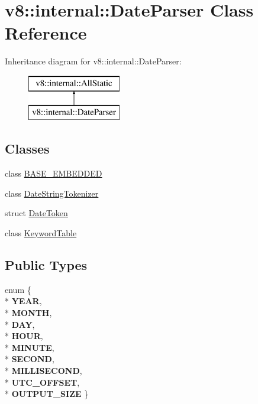 \hypertarget{classv8_1_1internal_1_1_date_parser}{}\section{v8\+:\+:internal\+:\+:Date\+Parser Class Reference}
\label{classv8_1_1internal_1_1_date_parser}
Inheritance diagram for v8\+:\+:internal\+:\+:Date\+Parser\+:\begin{figure}[H]
\begin{center}
\leavevmode
\includegraphics[height=2.000000cm]{classv8_1_1internal_1_1_date_parser}
\end{center}
\end{figure}
\subsection*{Classes}
\begin{DoxyCompactItemize}
\item 
class \hyperlink{classv8_1_1internal_1_1_date_parser_1_1_b_a_s_e___e_m_b_e_d_d_e_d}{B\+A\+S\+E\+\_\+\+E\+M\+B\+E\+D\+D\+ED}
\item 
class \hyperlink{classv8_1_1internal_1_1_date_parser_1_1_date_string_tokenizer}{Date\+String\+Tokenizer}
\item 
struct \hyperlink{structv8_1_1internal_1_1_date_parser_1_1_date_token}{Date\+Token}
\item 
class \hyperlink{classv8_1_1internal_1_1_date_parser_1_1_keyword_table}{Keyword\+Table}
\end{DoxyCompactItemize}
\subsection*{Public Types}
\begin{DoxyCompactItemize}
\item 
enum \{ \\*
{\bfseries Y\+E\+AR}, 
\\*
{\bfseries M\+O\+N\+TH}, 
\\*
{\bfseries D\+AY}, 
\\*
{\bfseries H\+O\+UR}, 
\\*
{\bfseries M\+I\+N\+U\+TE}, 
\\*
{\bfseries S\+E\+C\+O\+ND}, 
\\*
{\bfseries M\+I\+L\+L\+I\+S\+E\+C\+O\+ND}, 
\\*
{\bfseries U\+T\+C\+\_\+\+O\+F\+F\+S\+ET}, 
\\*
{\bfseries O\+U\+T\+P\+U\+T\+\_\+\+S\+I\+ZE}
 \}\hypertarget{classv8_1_1internal_1_1_date_parser_a62a7b9c992d69545b781892cf50e5ec0}{}\label{classv8_1_1internal_1_1_date_parser_a62a7b9c992d69545b781892cf50e5ec0}

\end{DoxyCompactItemize}
